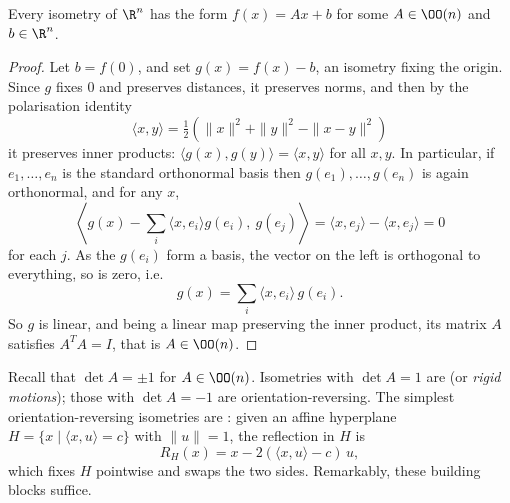 \begin{theorem}
    Every isometry of $\R^n$ has the form $f(x) = Ax + b$ for some $A \in \OO(n)$ and $b \in \R^n$.
\end{theorem}
\begin{proof}
    Let $b = f(0)$, and set $g(x) = f(x) - b$, an isometry fixing the origin. Since $g$ fixes $0$ and preserves distances, it preserves norms, and then by the polarisation identity
    $$
    \langle x, y \rangle = \tfrac{1}{2}\left(\|x\|^2 + \|y\|^2 - \|x - y\|^2\right)
    $$
    it preserves inner products: $\langle g(x), g(y) \rangle = \langle x, y \rangle$ for all $x, y$.
    In particular, if $e_1, \dots, e_n$ is the standard orthonormal basis then $g(e_1), \dots, g(e_n)$ is again orthonormal, and for any $x$,
    $$
    \left\langle g(x) - \sum_i \langle x, e_i \rangle g(e_i),\ g(e_j) \right\rangle = \langle x, e_j \rangle - \langle x, e_j \rangle = 0
    $$
    for each $j$. As the $g(e_i)$ form a basis, the vector on the left is orthogonal to everything, so is zero, i.e.
    $$
    g(x) = \sum_i \langle x, e_i \rangle \, g(e_i).
    $$
    So $g$ is linear, and being a linear map preserving the inner product, its matrix $A$ satisfies $A^TA = I$, that is $A \in \OO(n)$.
\end{proof}

Recall that $\det A = \pm 1$ for $A \in \OO(n)$. Isometries with $\det A = 1$ are  (or \emph{rigid motions}); those with $\det A = -1$ are orientation-reversing. The simplest orientation-reversing isometries are : given an affine hyperplane $H = \{x \mid \langle x, u \rangle = c\}$ with $\|u\| = 1$, the reflection in $H$ is
$$
R_H(x) = x - 2 (\langle x, u \rangle - c)\, u,
$$
which fixes $H$ pointwise and swaps the two sides. Remarkably, these building blocks suffice.

